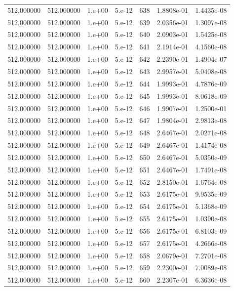 \begin{table}[htbp]
\begin{tabular}{rrrrrrr}
512.000000 & 512.000000 & 1.e+00 & 5.e-12 & 638 & 1.8808e-01 & 1.4435e-08 \\
512.000000 & 512.000000 & 1.e+00 & 5.e-12 & 639 & 2.0356e-01 & 1.3097e-08 \\
512.000000 & 512.000000 & 1.e+00 & 5.e-12 & 640 & 2.0903e-01 & 1.5425e-08 \\
512.000000 & 512.000000 & 1.e+00 & 5.e-12 & 641 & 2.1914e-01 & 4.1560e-08 \\
512.000000 & 512.000000 & 1.e+00 & 5.e-12 & 642 & 2.2390e-01 & 1.4904e-07 \\
512.000000 & 512.000000 & 1.e+00 & 5.e-12 & 643 & 2.9957e-01 & 5.0408e-08 \\
512.000000 & 512.000000 & 1.e+00 & 5.e-12 & 644 & 1.9993e-01 & 4.7876e-09 \\
512.000000 & 512.000000 & 1.e+00 & 5.e-12 & 645 & 1.9993e-01 & 8.0618e-09 \\
512.000000 & 512.000000 & 1.e+00 & 5.e-12 & 646 & 1.9907e-01 & 1.2500e-01 \\
512.000000 & 512.000000 & 1.e+00 & 5.e-12 & 647 & 1.9804e-01 & 2.9813e-08 \\
512.000000 & 512.000000 & 1.e+00 & 5.e-12 & 648 & 2.6467e-01 & 2.0271e-08 \\
512.000000 & 512.000000 & 1.e+00 & 5.e-12 & 649 & 2.6467e-01 & 1.4174e-08 \\
512.000000 & 512.000000 & 1.e+00 & 5.e-12 & 650 & 2.6467e-01 & 5.0350e-09 \\
512.000000 & 512.000000 & 1.e+00 & 5.e-12 & 651 & 2.6467e-01 & 1.7491e-08 \\
512.000000 & 512.000000 & 1.e+00 & 5.e-12 & 652 & 2.8150e-01 & 1.6764e-08 \\
512.000000 & 512.000000 & 1.e+00 & 5.e-12 & 653 & 2.6175e-01 & 9.9535e-09 \\
512.000000 & 512.000000 & 1.e+00 & 5.e-12 & 654 & 2.6175e-01 & 5.1368e-09 \\
512.000000 & 512.000000 & 1.e+00 & 5.e-12 & 655 & 2.6175e-01 & 1.0390e-08 \\
512.000000 & 512.000000 & 1.e+00 & 5.e-12 & 656 & 2.6175e-01 & 6.8103e-09 \\
512.000000 & 512.000000 & 1.e+00 & 5.e-12 & 657 & 2.6175e-01 & 4.2666e-08 \\
512.000000 & 512.000000 & 1.e+00 & 5.e-12 & 658 & 2.0679e-01 & 7.2701e-08 \\
512.000000 & 512.000000 & 1.e+00 & 5.e-12 & 659 & 2.2300e-01 & 7.0089e-08 \\
512.000000 & 512.000000 & 1.e+00 & 5.e-12 & 660 & 2.2307e-01 & 6.3636e-08 \\

\end{tabular}
\end{table}
